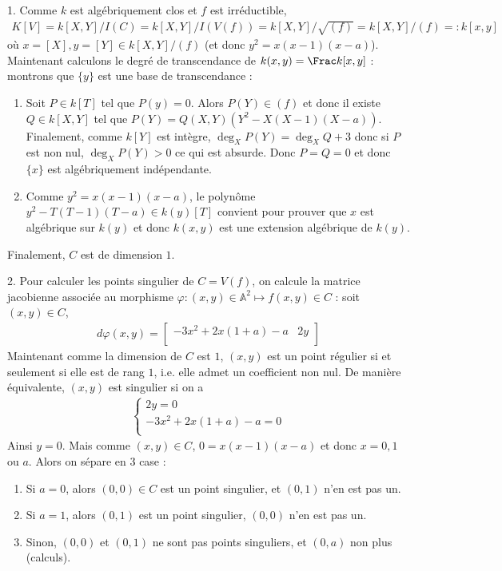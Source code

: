 \documentclass[11pt]{article}
\begin{document}
\begin{question}{1.}
    Comme $k$ est algébriquement clos et $f$ est irréductible,
    \begin{align*}
        K[V] = k[X,Y]/I(C) = k[X,Y]/I(V(f)) = k[X,Y]/\sqrt{(f)} = k[X,Y]/(f) =: k[x,y]
    \end{align*}
    où $x = [X], y = [Y] \in k[X,Y]/(f)$ (et donc $y^2 = x(x-1)(x-a)$). Maintenant calculons le degré de transcendance de $k(x,y) = \Frac k[x,y]$ : montrons que $\{y\}$ est une base de transcendance :
    \begin{enumerate}
        \item Soit $P \in k[T]$ tel que $P(y) = 0$. Alors $P(Y) \in (f)$ et donc il existe $Q \in k[X,Y]$ tel que $P(Y) = Q(X,Y)(Y^2 - X(X-1)(X-a))$. Finalement, comme $k[Y]$ est intègre, $\deg_X P(Y) = \deg_X Q + 3$ donc si $P$ est non nul, $\deg_X P(Y) > 0$ ce qui est absurde. Donc $P = Q = 0$ et donc $\{x\}$ est algébriquement indépendante.
        \item Comme $y^2 = x(x-1)(x-a)$, le polynôme $y^2 - T(T-1)(T-a) \in k(y)[T]$ convient pour prouver que $x$ est algébrique sur $k(y)$ et donc $k(x,y)$ est une extension algébrique de $k(y)$.
    \end{enumerate}
    Finalement, $C$ est de dimension $1$.
\end{question}
\begin{question}{2.}
    Pour calculer les points singulier de $C = V(f)$, on calcule la matrice jacobienne associée au morphisme $\varphi : (x,y) \in \mathbb{A}^2 \mapsto f(x,y) \in C$ : soit $(x,y) \in C$, 
    \begin{align*}
        d \varphi(x,y) = 
        \begin{bmatrix}
            -3x^2 +2x(1 + a) - a & 2y \\
        \end{bmatrix}
    \end{align*}
    Maintenant comme la dimension de $C$ est $1$, $(x,y)$ est un point régulier si et seulement si elle est de rang $1$, i.e. elle admet un coefficient non nul. De manière équivalente, $(x,y)$ est singulier si on a
    \begin{align*}
        \begin{cases}
            2y = 0 \\
            -3x^2 +2x(1 + a) - a = 0 \\
        \end{cases}
    \end{align*}
    Ainsi $y = 0$. Mais comme $(x,y) \in C$, $0 = x(x-1)(x-a)$ et donc $x = 0,1$ ou $a$. Alors on sépare en $3$ case :
    \begin{enumerate}
        \item Si $a = 0$, alors $(0,0) \in C$ est un point singulier, et $(0,1)$ n'en est pas un.
        \item Si $a = 1$, alors $(0,1)$ est un point singulier, $(0,0)$ n'en est pas un.
        \item Sinon, $(0,0)$ et $(0,1)$ ne sont pas points singuliers, et $(0,a)$ non plus (calculs). 
    \end{enumerate}
\end{question}
\end{document}
